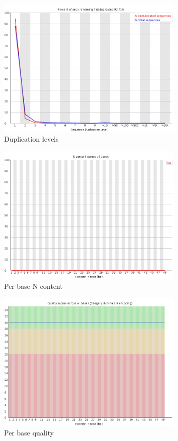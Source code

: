\documentclass[UTF8]{ctexart}
\begin{document}
\begin{figure}[!htb]
	\centering
	\includegraphics[width=0.8\textwidth]{img/SRR14325859_FastQC_Origin_img/duplication_levels.png}	%
	\caption{Duplication levels\protect}    %
\end{figure}

\begin{figure}[!htb]
	\centering
	\includegraphics[width=0.8\textwidth]{img/SRR14325859_FastQC_Origin_img/per_base_n_content.png}	%
	\caption{Per base N content\protect}    %
\end{figure}

\begin{figure}[!htb]
	\centering
	\includegraphics[width=0.8\textwidth]{img/SRR14325859_FastQC_Origin_img/per_base_quality.png}	%
	\caption{Per base quality\protect}    %
\end{figure}
\end{document}
